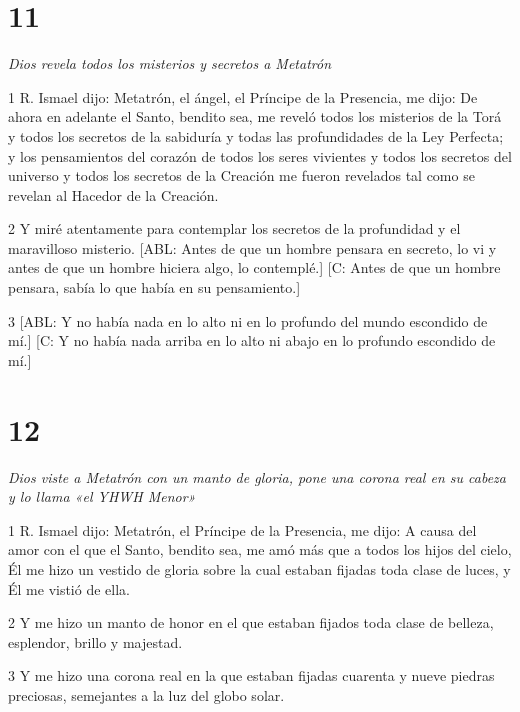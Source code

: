 \chapter{11}

\par \textit{Dios revela todos los misterios y secretos a Metatrón}

\par 1 R. Ismael dijo: Metatrón, el ángel, el Príncipe de la Presencia, me dijo: De ahora en adelante el Santo, bendito sea, me reveló todos los misterios de la Torá y todos los secretos de la sabiduría y todas las profundidades de la Ley Perfecta; y los pensamientos del corazón de todos los seres vivientes y todos los secretos del universo y todos los secretos de la Creación me fueron revelados tal como se revelan al Hacedor de la Creación.

\par 2 Y miré atentamente para contemplar los secretos de la profundidad y el maravilloso misterio. [ABL: Antes de que un hombre pensara en secreto, lo vi y antes de que un hombre hiciera algo, lo contemplé.] [C: Antes de que un hombre pensara, sabía lo que había en su pensamiento.]

\par 3 [ABL: Y no había nada en lo alto ni en lo profundo del mundo escondido de mí.] [C: Y no había nada arriba en lo alto ni abajo en lo profundo escondido de mí.]

\chapter{12}

\par \textit{Dios viste a Metatrón con un manto de gloria, pone una corona real en su cabeza y lo llama «el YHWH Menor»}

\par 1 R. Ismael dijo: Metatrón, el Príncipe de la Presencia, me dijo: A causa del amor con el que el Santo, bendito sea, me amó más que a todos los hijos del cielo, Él me hizo un vestido de gloria sobre la cual estaban fijadas toda clase de luces, y Él me vistió de ella.

\par 2 Y me hizo un manto de honor en el que estaban fijados toda clase de belleza, esplendor, brillo y majestad.

\par 3 Y me hizo una corona real en la que estaban fijadas cuarenta y nueve piedras preciosas, semejantes a la luz del globo solar.

